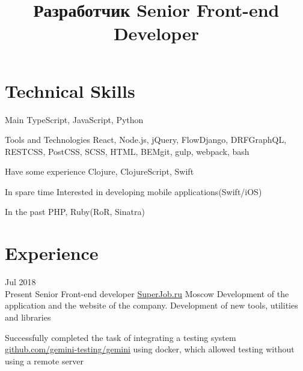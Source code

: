 \documentclass[11pt,a4paper,sans]{moderncv}
\title
    {\lang
        {Разработчик}
        {Senior Front-end Developer}}
\newcommand{\lang}[2]{#2}
\begin{document}
\maketitle

\section
{\lang
	{Технические навыки}
	{Technical Skills}}

\cvline
{\lang
	{Главное}
	{Main}}
{TypeScript, JavaScript, Python}

\cvline
{\lang
	{Использую инструменты и технологии}
	{Tools and Technologies}}
{React, Node.js, jQuery, Flow{\newline}Django, DRF{\newline}GraphQL, REST{\newline}CSS, PostCSS, SCSS, HTML, BEM{\newline}git, gulp, webpack, bash}

\cvline
{\lang
	{Имею небольшой опыт}
	{Have some experience}}
{Clojure, ClojureScript, Swift}

\cvline
{\lang
	{В свободное время}
	{In spare time}}
{\lang
	{интересуюсь языком программирования Rust и мобильной разработкой iOS}
	{Interested in developing mobile applications(Swift/iOS)}\newline}

\cvline
{\lang
	{В прошлом}
	{In the past}}
{PHP, Ruby(RoR, Sinatra)}

\section
{\lang
	{Опыт работы}
	{Experience}}





\cventry
{\lang{Июл}{Jul} 2018\\\lang{по н.в.}{Present}}
{\lang
	{Фронтенд разработчик}
	{Senior Front-end developer}}
{\href{https://superjob.ru}{SuperJob.ru}}
{\lang
	{Москва}
	{Moscow}}
{}
{\lang
	{Разработка и поддержка сайта компании, создание новых инструментов, утилит и библиотек}
	{Development of the application and the website of the company. Development of new tools, utilities and libraries}}

\cvlistitem
{\lang
	{Успешно реализовал задачу по интеграции системы тестирования gemini(\href{https://github.com/gemini-testing/gemini}{github.com/gemini-testing/gemini}) используя docker, что позволило проводить тестирование без использования удаленного сервера}
	{Successfully completed the task of integrating a testing system \href{https://github.com/gemini-testing/gemini}{github.com/gemini-testing/gemini} using docker, which allowed testing without using a remote server}\\}
					
\end{document}
